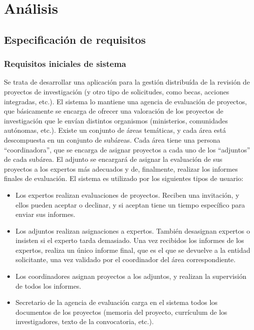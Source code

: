 \documentclass[12pt,a4paper,titlepage,spanish,twoside]{book}
\begin{document}
\part{Análisis}
\chapter{Especificación de requisitos}
\section{Requisitos iniciales de sistema}
Se trata de desarrollar una aplicación para la gestión distribuída de la
revisión de proyectos de investigación (y otro tipo de solicitudes, como
becas, acciones integradas, etc.). El sistema lo mantiene una agencia de
evaluación de proyectos, que básicamente se encarga de ofrecer una valoración
de los proyectos de investigación que le envían distintos organismos
(ministerios, comunidades autónomas, etc.). Existe un conjunto de áreas
temáticas, y cada área está descompuesta en un conjunto de subáreas. Cada
área tiene una persona ``coordinadora'', que se encarga de asignar proyectos
a cada uno de los ``adjuntos'' de cada subárea. El adjunto se encargará de
asignar la evaluación de sus proyectos a los expertos más adecuados y de,
finalmente, realizar los informes finales de evaluación. El sistema es
utilizado por los siguientes tipos de usuario: 

\begin{itemize}
\item Los expertos realizan evaluaciones de proyectos. Reciben una 
  invitación, y ellos pueden aceptar o declinar, y si aceptan tiene un tiempo 
  específico para enviar sus informes. 
\item Los adjuntos realizan asignaciones a expertos. También desasignan
  expertos o insisten si el experto tarda demasiado. Una vez recibidos los 
  informes de los expertos, realiza un único informe final, que es el que se 
  devuelve a la entidad solicitante, una vez validado por el coordinador del 
  área correspondiente. 
\item Los coordinadores asignan proyectos a los adjuntos, y realizan la
  supervisión de todos los informes.
\item Secretario de la agencia de evaluación carga en el sistema todos
  los documentos de los proyectos (memoria del proyecto, currículum de los
  investigadores, texto de la convocatoria, etc.). 
\end{itemize}
\end{document}
